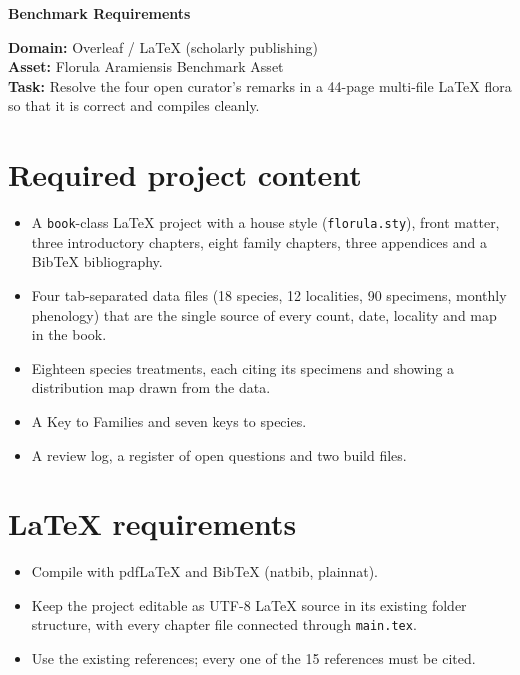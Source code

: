 \documentclass[11pt,a4paper]{article}
\begin{document}
\sloppy

{\Large\bfseries Benchmark Requirements}\par
\medskip
\textbf{Domain:} Overleaf / LaTeX (scholarly publishing)\\
\textbf{Asset:} Florula Aramiensis Benchmark Asset\\
\textbf{Task:} Resolve the four open curator's remarks in a 44-page
multi-file LaTeX flora so that it is correct and compiles cleanly.

\section*{Required project content}
\begin{itemize}
\item A \texttt{book}-class LaTeX project with a house style
  (\texttt{florula.sty}), front matter, three introductory chapters,
  eight family chapters, three appendices and a BibTeX bibliography.
\item Four tab-separated data files (18 species, 12 localities,
  90 specimens, monthly phenology) that are the single source of every
  count, date, locality and map in the book.
\item Eighteen species treatments, each citing its specimens and
  showing a distribution map drawn from the data.
\item A Key to Families and seven keys to species.
\item A review log, a register of open questions and two build files.
\end{itemize}

\section*{LaTeX requirements}
\begin{itemize}
\item Compile with pdfLaTeX and BibTeX (natbib, plainnat).
\item Keep the project editable as UTF-8 LaTeX source in its existing
  folder structure, with every chapter file connected through
  \texttt{main.tex}.
\item Use the existing references; every one of the 15 references must
  be cited.
\end{itemize}
\end{document}

